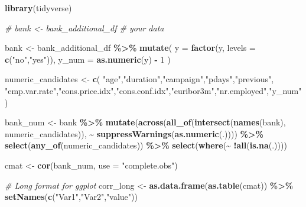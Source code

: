 \documentclass[
]{article}
\newenvironment{Shaded}{\begin{snugshade}}{\end{snugshade}}
\newcommand{\AttributeTok}[1]{\textcolor[rgb]{0.13,0.29,0.53}{#1}}
\newcommand{\CommentTok}[1]{\textcolor[rgb]{0.56,0.35,0.01}{\textit{#1}}}
\newcommand{\DecValTok}[1]{\textcolor[rgb]{0.00,0.00,0.81}{#1}}
\newcommand{\FunctionTok}[1]{\textcolor[rgb]{0.13,0.29,0.53}{\textbf{#1}}}
\newcommand{\NormalTok}[1]{#1}
\newcommand{\OtherTok}[1]{\textcolor[rgb]{0.56,0.35,0.01}{#1}}
\newcommand{\SpecialCharTok}[1]{\textcolor[rgb]{0.81,0.36,0.00}{\textbf{#1}}}
\newcommand{\StringTok}[1]{\textcolor[rgb]{0.31,0.60,0.02}{#1}}
\begin{document}
\begin{Shaded}
\begin{Highlighting}[]
\FunctionTok{library}\NormalTok{(tidyverse)}

\CommentTok{\# bank \textless{}{-} bank\_additional\_df  \# your data}

\NormalTok{bank }\OtherTok{\textless{}{-}}\NormalTok{ bank\_additional\_df }\SpecialCharTok{\%\textgreater{}\%}
  \FunctionTok{mutate}\NormalTok{(}
    \AttributeTok{y =} \FunctionTok{factor}\NormalTok{(y, }\AttributeTok{levels =} \FunctionTok{c}\NormalTok{(}\StringTok{"no"}\NormalTok{,}\StringTok{"yes"}\NormalTok{)),}
    \AttributeTok{y\_num =} \FunctionTok{as.numeric}\NormalTok{(y) }\SpecialCharTok{{-}} \DecValTok{1}
\NormalTok{  )}

\NormalTok{numeric\_candidates }\OtherTok{\textless{}{-}} \FunctionTok{c}\NormalTok{(}
  \StringTok{"age"}\NormalTok{,}\StringTok{"duration"}\NormalTok{,}\StringTok{"campaign"}\NormalTok{,}\StringTok{"pdays"}\NormalTok{,}\StringTok{"previous"}\NormalTok{,}
  \StringTok{"emp.var.rate"}\NormalTok{,}\StringTok{"cons.price.idx"}\NormalTok{,}\StringTok{"cons.conf.idx"}\NormalTok{,}\StringTok{"euribor3m"}\NormalTok{,}\StringTok{"nr.employed"}\NormalTok{,}\StringTok{"y\_num"}
\NormalTok{)}

\NormalTok{bank\_num }\OtherTok{\textless{}{-}}\NormalTok{ bank }\SpecialCharTok{\%\textgreater{}\%}
  \FunctionTok{mutate}\NormalTok{(}\FunctionTok{across}\NormalTok{(}\FunctionTok{all\_of}\NormalTok{(}\FunctionTok{intersect}\NormalTok{(}\FunctionTok{names}\NormalTok{(bank), numeric\_candidates)),}
                \SpecialCharTok{\textasciitilde{}} \FunctionTok{suppressWarnings}\NormalTok{(}\FunctionTok{as.numeric}\NormalTok{(.)))) }\SpecialCharTok{\%\textgreater{}\%}
  \FunctionTok{select}\NormalTok{(}\FunctionTok{any\_of}\NormalTok{(numeric\_candidates)) }\SpecialCharTok{\%\textgreater{}\%}
  \FunctionTok{select}\NormalTok{(}\FunctionTok{where}\NormalTok{(}\SpecialCharTok{\textasciitilde{}} \SpecialCharTok{!}\FunctionTok{all}\NormalTok{(}\FunctionTok{is.na}\NormalTok{(.))))}

\NormalTok{cmat }\OtherTok{\textless{}{-}} \FunctionTok{cor}\NormalTok{(bank\_num, }\AttributeTok{use =} \StringTok{"complete.obs"}\NormalTok{)}

\CommentTok{\# Long format for ggplot}
\NormalTok{corr\_long }\OtherTok{\textless{}{-}} \FunctionTok{as.data.frame}\NormalTok{(}\FunctionTok{as.table}\NormalTok{(cmat)) }\SpecialCharTok{\%\textgreater{}\%}
  \FunctionTok{setNames}\NormalTok{(}\FunctionTok{c}\NormalTok{(}\StringTok{"Var1"}\NormalTok{,}\StringTok{"Var2"}\NormalTok{,}\StringTok{"value"}\NormalTok{))}


\end{Highlighting}
\end{Shaded}
\end{document}
